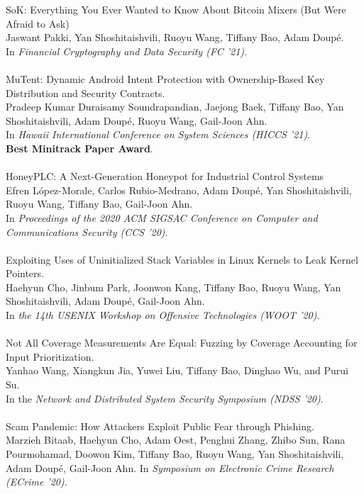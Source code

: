 \documentclass[11pt]{article}
\begin{document}
SoK: Everything You Ever Wanted to Know About Bitcoin Mixers (But Were Afraid to Ask) \\
Jaswant Pakki, Yan Shoshitaishvili, Ruoyu Wang, Tiffany Bao, Adam Doupé. \\
In \emph{Financial Cryptography and Data Security (FC '21)}.
\\\\
MuTent: Dynamic Android Intent Protection with Ownership-Based Key Distribution and Security Contracts. \\
Pradeep Kumar Duraisamy Soundrapandian, Jaejong Baek, Tiffany Bao, Yan Shoshitaishvili, Adam Doupé, Ruoyu Wang, Gail-Joon Ahn. \\
In \emph{Hawaii International Conference on System Sciences (HICCS '21)}. \\
\textbf{Best Minitrack Paper Award}.
\\\\
HoneyPLC: A Next-Generation Honeypot for Industrial Control Systems \\
Efren L\'{o}pez-Morale, Carlos Rubio-Medrano, Adam Doup\'{e}, Yan Shoshitaishvili, Ruoyu Wang, Tiffany Bao, Gail-Joon Ahn.\\
In \emph{Proceedings of the 2020 ACM SIGSAC Conference on Computer and Communications Security (CCS '20)}.
\\\\
Exploiting Uses of Uninitialized Stack Variables in Linux Kernels to Leak Kernel Pointers. \\
Haehyun Cho, Jinbum Park, Joonwon Kang, Tiffany Bao, Ruoyu Wang, Yan Shoshitaishvili, Adam Doupé, Gail-Joon Ahn. \\
In \emph{the 14th USENIX Workshop on Offensive Technologies (WOOT '20)}.
\\\\
Not All Coverage Measurements Are Equal: Fuzzing by Coverage Accounting for Input Prioritization. \\
Yanhao Wang, Xiangkun Jia, Yuwei Liu, Tiffany Bao, Dinghao Wu, and Purui Su. \\
In the \emph{Network and Distributed System Security Symposium (NDSS '20)}.
\\\\
Scam Pandemic: How Attackers Exploit Public Fear through Phishing. \\
Marzieh Bitaab, Haehyun Cho, Adam Oest, Penghui Zhang, Zhibo Sun, Rana Pourmohamad, Doowon Kim, Tiffany Bao, Ruoyu Wang, Yan Shoshitaishvili, Adam Doupé, Gail-Joon Ahn.
In \emph{Symposium on Electronic Crime Research (ECrime '20)}.
\end{document}
